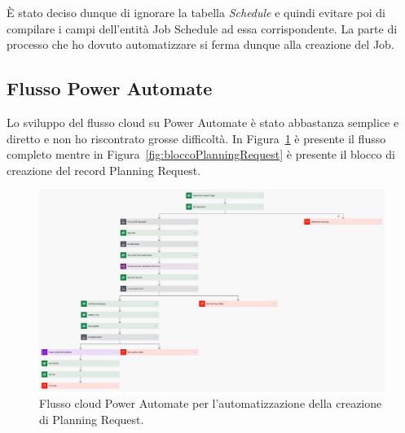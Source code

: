 È stato deciso dunque di ignorare la tabella \textit{Schedule} e quindi evitare poi di compilare i campi dell'entità Job Schedule ad essa corrispondente. La parte di processo che ho dovuto automatizzare si ferma dunque alla creazione del Job.

\subsection{Flusso Power Automate}
Lo sviluppo del flusso cloud su Power Automate è stato abbastanza semplice e diretto e non ho riscontrato grosse difficoltà. In Figura~\ref{fig:flussoTfl} è presente il flusso completo mentre in Figura~\ref{fig:bloccoPlanningRequest} è presente il blocco di creazione del record Planning Request.

\begin{figure}[ht]
  \centering
  \includegraphics[width=\textwidth]{flusso-cloud-tfl.png}
  \caption{Flusso cloud Power Automate per l'automatizzazione della creazione di Planning Request.}
  \label{fig:flussoTfl}
\end{figure}

